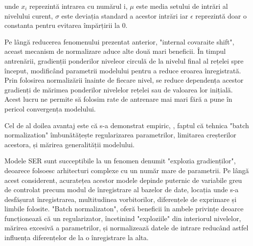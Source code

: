 \documentclass[a4paper,12pt]{book}
\begin{document}
				\quad unde $x_i$ reprezintă intrarea cu numărul i, $\mu$ este media setului de intrări al nivelului curent, $\sigma$ este deviația standard a acestor intrări iar $\epsilon$ reprezintă doar o constanta pentru evitarea împărțirii la 0.
				
				Pe lângă reducerea fenomenului prezentat anterior, "internal covaraite shift", aceast mecanism de normalizare aduce alte două mari beneficii. În timpul antrenării, gradienții ponderilor niveleor circulă de la nivelul final al rețelei spre început, modificând parametrii modelului pentru a reduce eroarea înregistrată.
				Prin folosirea normalizării înainte de fiecare nivel, se reduce dependența acestor gradienți de mărimea ponderilor nivelelor rețelei sau de valoarea lor inițială. Acest lucru ne permite să folosim rate de antrenare mai mari fără a pune în pericol convergența modelului. \par
				Cel de al doilea avantaj este că s-a demonstrat empiric, \cite{batch_norm}, faptul că tehnica "batch normalization" îmbunătățește regularizarea parametrilor, limitarea creșterilor acestora, și mărirea generalității modelului. \par
				Modele SER sunt succeptibile la un fenomen denumit "explozia gradienților", deoarece folsoesc arhitecturi complexe cu un număr mare de parametrii. Pe lângă acest considerent, acuratețea acestor modele depinde puternic de variabile greu de controlat precum modul de înregistrare al bazelor de date, locația unde s-a desfășurat înregistrarea, multitudinea vorbitorilor, diferențele de exprimare și limbile folosite. "Batch normalizaton", oferă beneficii în ambele privințe deoarce funcționează că un regularizator, încetinind "exploziile" din interiorul nivelelor, mărirea excesivă a parametrilor, și normalizează datele de intrare reducând astfel influența diferențelor de la o înregistrare la alta. \par
\end{document}
